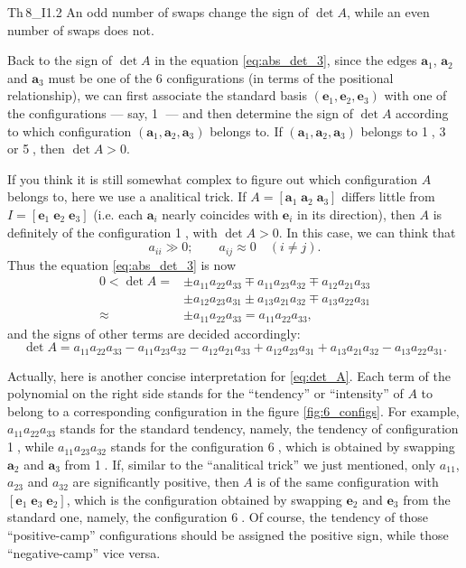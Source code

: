 \documentclass{article}
\begin{document}
\begin{Th}{Th\,8\_I1.2}
    An odd number of swaps change the sign of $\det A$, while an even number of swaps does not.
\end{Th}

Back to the sign of $\det A$ in the equation \ref{eq:abs_det_3}, since the edges $\pmb{a}_1$, $\pmb{a}_2$ and $\pmb{a}_3$ must be one of the 6 configurations (in terms of the positional relationship), we can first associate the standard basis $(\pmb{e}_1, \pmb{e}_2, \pmb{e}_3)$ with one of the configurations — say, \textcircled{1} — and then determine the sign of $\det A$ according to which configuration $(\pmb{a}_1, \pmb{a}_2, \pmb{a}_3)$ belongs to. If $(\pmb{a}_1, \pmb{a}_2, \pmb{a}_3)$ belongs to \textcircled{1}, \textcircled{3} or \textcircled{5}, then $\det A>0$.

If you think it is still somewhat complex to figure out which configuration $A$ belongs to, here we use a analitical trick. If $A = [\pmb{a}_1\;\pmb{a}_2\;\pmb{a}_3]$ differs little from $I = [\pmb{e}_1\;\pmb{e}_2\;\pmb{e}_3]$ (i.e. each $\pmb{a}_i$ nearly coincides with $\pmb{e}_i$ in its direction), then $A$ is definitely of the configuration \textcircled{1}, with $\det A>0$. In this case, we can think that
$$ a_{ii} \gg 0; \qquad a_{ij}\approx 0 \quad (i\neq j). $$
Thus the equation \ref{eq:abs_det_3} is now
$$ 
\begin{aligned}
    0 < \det A = & \pm a_{11}a_{22}a_{33} \mp a_{11}a_{23}a_{32} \mp a_{12}a_{21}a_{33} \\
    & \pm a_{12}a_{23}a_{31} \pm a_{13}a_{21}a_{32} \mp a_{13}a_{22}a_{31} \\
    \approx & \pm a_{11}a_{22}a_{33} = a_{11}a_{22}a_{33},
\end{aligned}
$$
and the signs of other terms are decided accordingly:
\begin{equation}
    \det A = a_{11}a_{22}a_{33} - a_{11}a_{23}a_{32} - a_{12}a_{21}a_{33} + a_{12}a_{23}a_{31} + a_{13}a_{21}a_{32} - a_{13}a_{22}a_{31}. 
    \label{eq:det_A}
\end{equation}

Actually, here is another concise interpretation for \ref{eq:det_A}. Each term of the polynomial on the right side stands for the ``tendency'' or ``intensity'' of $A$ to belong to a corresponding configuration in the figure \ref{fig:6_configs}. For example, $a_{11}a_{22}a_{33}$ stands for the standard tendency, namely, the tendency of configuration \textcircled{1}, while $a_{11}a_{23}a_{32}$ stands for the configuration \textcircled{6}, which is obtained by swapping $\pmb{a}_2$ and $\pmb{a}_3$ from \textcircled{1}. If, similar to the ``analitical trick'' we just mentioned, only $a_{11}$, $a_{23}$ and $a_{32}$ are significantly positive, then $A$ is of the same configuration with $[\pmb{e}_1\;\pmb{e}_3\;\pmb{e}_2]$, which is the configuration obtained by swapping $\pmb{e}_2$ and $\pmb{e}_3$ from the standard one, namely, the configuration \textcircled{6}. Of course, the tendency of those ``positive-camp'' configurations should be assigned the positive sign, while those ``negative-camp'' vice versa.
\end{document}
